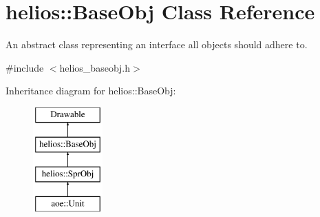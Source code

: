 \hypertarget{classhelios_1_1_base_obj}{}\section{helios\+:\+:Base\+Obj Class Reference}
\label{classhelios_1_1_base_obj}


An abstract class representing an interface all objects should adhere to.  




{\ttfamily \#include $<$helios\+\_\+baseobj.\+h$>$}

Inheritance diagram for helios\+:\+:Base\+Obj\+:\begin{figure}[H]
\begin{center}
\leavevmode
\includegraphics[height=4.000000cm]{classhelios_1_1_base_obj}
\end{center}
\end{figure}

